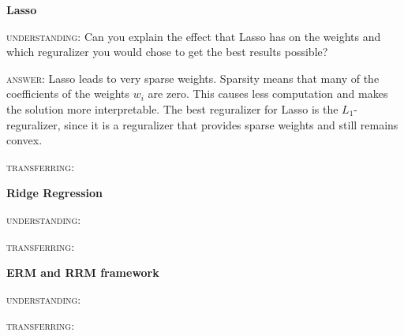 \documentclass{article}
\begin{document}
\thispagestyle{empty}


\vspace{10mm}
\textbf{Lasso}

\textsc{understanding:} Can you explain the effect that Lasso has on the weights and which reguralizer you would chose to get the best results possible?

\textsc{answer:} Lasso leads to very sparse weights. Sparsity means that many of the coefficients of the weights $w_i$ are zero. This causes less computation and makes the solution more interpretable. The best reguralizer for Lasso is the $L_1$-reguralizer, since it is a reguralizer that provides sparse weights and still remains convex.

\textsc{transferring:}



\vspace{10mm}
\textbf{Ridge Regression}

\textsc{understanding:} 

\textsc{transferring:}



\vspace{10mm}
\textbf{ERM and RRM framework}

\textsc{understanding:} 

\textsc{transferring:}
\end{document}
